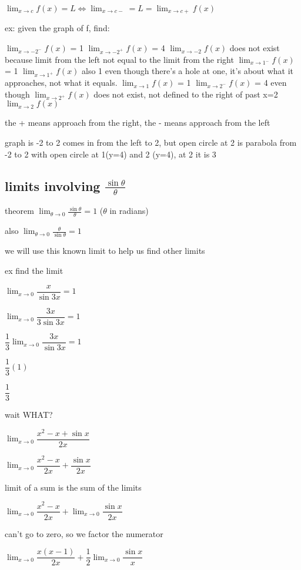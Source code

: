 \documentclass[12pt]{article}
\begin{document}
$\lim_{x \to c}f(x) = L \iff \lim_{x \to c -} = L = \lim_{x \to c +}f(x)$

ex: given the graph of f, find:

$\lim_{x \to -2^-}f(x)$ = 1
$\lim_{x \to -2^+}f(x)$ = 4
$\lim_{x \to -2}f(x)$ does not exist because limit from the left not equal to the limit from the right
$\lim_{x \to 1^-}f(x)$ = 1
$\lim_{x \to 1^+}f(x)$ also 1
even though there's a hole at one, it's about what it approaches, not what it equals.
$\lim_{x \to 1}f(x)$ = 1
$\lim_{x \to 2^-}f(x)$ = 4 even though
$\lim_{x \to 2^+}f(x)$ does not exist, not defined to the right of past x=2
$\lim_{x \to 2}f(x)$

the + means approach from the right,
the - means approach from the left

graph is -2 to 2
comes in from the left to 2, but open circle at 2
is parabola from -2 to 2
with open circle at 1(y=4) and 2 (y=4), at 2 it is 3

\subsection{limits involving $\frac{\sin{\theta{}}}{\theta{}}$}

theorem $\lim_{\theta \to 0} \frac{\sin \theta}{\theta} = 1$ ($\theta$ in radians)

also $\lim_{\theta \to 0} \frac{\theta}{\sin \theta} = 1$

we will use this known limit to help us find other limits

ex find the limit

$\lim_{x \to 0} \dfrac{x}{\sin 3x} = 1$

$\lim_{x \to 0} \dfrac{3x}{3\sin 3x} = 1$

$\dfrac{1}{3} \lim_{x \to 0} \dfrac{3x}{\sin 3x} = 1$

$\dfrac{1}{3}(1)$

$\dfrac{1}{3}$

wait WHAT?

$\lim_{x \to 0}\dfrac{x^2 - x + \sin x}{2x}$

$\lim_{x \to 0}\dfrac{x^2 - x}{2x} + \dfrac{\sin x}{2x}$

limit of a sum is the sum of the limits

$\lim_{x \to 0}\dfrac{x^2 - x}{2x} + \lim_{x \to 0} \dfrac{\sin x}{2x}$

can't go to zero, so we factor the numerator

$\lim_{x \to 0}\dfrac{x(x - 1)}{2x} +\dfrac{1}{2} \lim_{x \to 0} \dfrac{\sin x}{x}$
\end{document}
